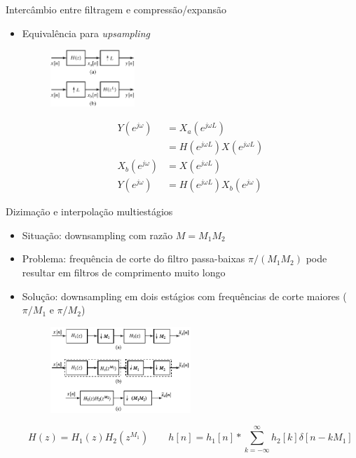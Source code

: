 \begin{slide}{Intercâmbio entre filtragem e compressão/expansão}
	\begin{itemize}
		\item Equivalência para \emph{upsampling}
			\begin{figure}
				\centering
				\includegraphics[width=0.3\textwidth]{figs/4-32.eps}
			\end{figure}
			\begin{align*}
				Y(e^{j\omega})&=X_a(e^{j\omega L})\\
				&=H(e^{j\omega L}) X(e^{j\omega L})\\
				X_b(e^{j\omega})&= X(e^{j\omega L})\\
				Y(e^{j\omega})&=H(e^{j\omega L})X_b(e^{j\omega })
			\end{align*}
	\end{itemize}
			
\end{slide}

\begin{slide}{Dizimação e interpolação multiestágios}
	\begin{itemize}
		\item Situação: downsampling com razão $M = M_1M_2$
		\item Problema: frequência de corte do filtro passa-baixas $\pi/(M_1M_2)$ pode resultar em filtros de comprimento muito longo
		\item Solução: downsampling em dois estágios com frequências de corte maiores ($\pi/M_1$ e $\pi/M_2$)
			\begin{figure}
				\centering
				\includegraphics[width=0.5\textwidth]{figs/4-33.eps}
			\end{figure}
			\begin{equation*}
				H(z) = H_1(z)H_2(z^{M_1})\qquad
				h[n] = h_1[n] * \sum_{k=-\infty}^\infty h_2[k]\delta[n-kM_1]
			\end{equation*}
	\end{itemize}
\end{slide}

